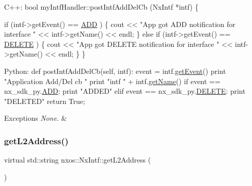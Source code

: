 \begin{DoxyCode}
C++:
    \textcolor{keywordtype}{bool} myIntfHandler::postIntfAddDelCb (NxIntf *intf)
    \{
     
    \textcolor{keywordflow}{if} (intf->getEvent() == \mbox{\hyperlink{namespacenxos_af9a9040b7681199d386e94eb888018cba93d8c810253e44a0fd5f3d8d26032ad5}{ADD}} ) \{
       cout << \textcolor{stringliteral}{"App got ADD notification for interface  "} << 
       intf->getName() << endl;
    \} \textcolor{keywordflow}{else} \textcolor{keywordflow}{if} (intf->getEvent() == \mbox{\hyperlink{namespacenxos_af9a9040b7681199d386e94eb888018cba7ec7c9f77651a43ea2562bb5bcb6a3a9}{DELETE}} ) \{
       cout << \textcolor{stringliteral}{"App got DELETE notification for interface "} << 
       intf->getName() << endl;
    \}
    \}  

 Python:
    def postIntfAddDelCb(\textcolor{keyword}{self}, intf):
       event = intf.\mbox{\hyperlink{classnxos_1_1_nx_intf_a148d8b41d613478294179277a03f3aeb}{getEvent}}()
       print \textcolor{stringliteral}{"Application Add/Del cb "}
       print \textcolor{stringliteral}{"intf "} + intf.\mbox{\hyperlink{classnxos_1_1_nx_intf_a8a0bff66b97d72172f8ed5ce22d8efbd}{getName}}()
       if event == nx\_sdk\_py.\mbox{\hyperlink{namespacenxos_af9a9040b7681199d386e94eb888018cba93d8c810253e44a0fd5f3d8d26032ad5}{ADD}}:
          print \textcolor{stringliteral}{"ADDED"}
       elif event == nx\_sdk\_py.\mbox{\hyperlink{namespacenxos_af9a9040b7681199d386e94eb888018cba7ec7c9f77651a43ea2562bb5bcb6a3a9}{DELETE}}:
          print \textcolor{stringliteral}{"DELETED"}
       return True;   
\end{DoxyCode}



\begin{DoxyExceptions}{Exceptions}
{\em None.} & \\
\hline
\end{DoxyExceptions}
\mbox{\label{classnxos_1_1_nx_intf_a8a7f92f0c28178165fd0448c33ff681b}} 
\subsubsection{\texorpdfstring{get\+L2\+Address()}{getL2Address()}}
{\footnotesize\ttfamily virtual std\+::string nxos\+::\+Nx\+Intf\+::get\+L2\+Address (\begin{DoxyParamCaption}{ }\end{DoxyParamCaption})\hspace{0.3cm}{\ttfamily [pure virtual]}}

